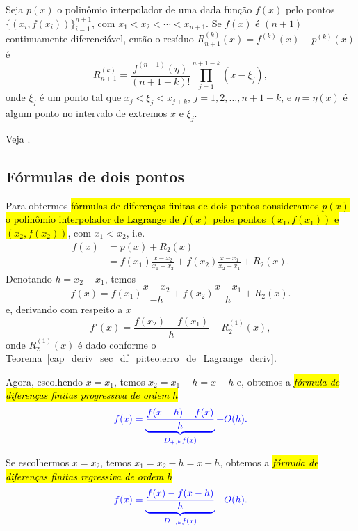 \begin{teo}\label{cap_deriv_sec_df_pi:teo:erro_de_Lagrange_deriv}
  Seja $p(x)$ o polinômio interpolador de uma dada função $f(x)$ pelo pontos $\{(x_i, f(x_i))\}_{i=1}^{n+1}$, com $x_1<x_2<\cdots<x_{n+1}$. Se $f(x)$ é $(n+1)$ continuamente diferenciável, então o resíduo $R_{n+1}^{(k)}(x) = f^{(k)}(x) - p^{(k)}(x)$ é
  \begin{equation}
    R_{n+1}^{(k)} = \frac{f^{(n+1)}(\eta) }{(n+1-k)!}\prod_{j=1}^{n+1-k}(x-\xi_j),
  \end{equation}
onde $\xi_j$ é um ponto tal que $x_j < \xi_j < x_{j+k}$, $j=1, 2, \dotsc, n+1+k$, e $\eta = \eta(x)$ é algum ponto no intervalo de extremos $x$ e $\xi_j$. 
\end{teo}
\begin{dem}
  Veja \cite[Ch.6, Sec.5]{Isaacson1994a}.
\end{dem}

\subsection{Fórmulas de dois pontos}

Para obtermos \hl{fórmulas de diferenças finitas de dois pontos consideramos  $p(x)$ o polinômio interpolador de Lagrange de $f(x)$ pelos pontos $(x_1, f(x_1))$ e $(x_2, f(x_2))$}, com $x_1 < x_2$, i.e.
\begin{align}
  f(x) &= p(x) + R_{2}(x)\\
  &= f(x_1)\frac{x-x_2}{x_1-x_2} + f(x_2)\frac{x-x_1}{x_2-x_1} + R_2(x).
\end{align}
Denotando $h=x_2-x_1$, temos
\begin{equation}
  f(x) = f(x_1)\frac{x-x_2}{-h} + f(x_2)\frac{x-x_1}{h} + R_2(x).
\end{equation}
e, derivando com respeito a $x$
\begin{equation}
  f'(x) = \frac{f(x_2)-f(x_1)}{h} + R_2^{(1)}(x),
\end{equation}
onde $ R_2^{(1)}(x)$ é dado conforme o Teorema~\ref{cap_deriv_sec_df_pi:teo:erro_de_Lagrange_deriv}.

Agora, escolhendo $x=x_1$, temos $x_2 = x_1 + h = x + h$ e, obtemos a \hl{\emph{fórmula de diferenças finitas progressiva de ordem $h$}}
\begin{equation}\color{blue}f(x) = \underbrace{\frac{f(x+h) - f(x)}{h}}_{D_{+,h}f(x)} + O(h).
\end{equation}

Se escolhermos $x=x_2$, temos $x_1 = x_2 - h = x - h$, obtemos a \hl{\emph{fórmula de diferenças finitas regressiva de ordem $h$}}
\begin{equation}\color{blue}f(x) = \underbrace{\frac{f(x) - f(x-h)}{h}}_{D_{-,h}f(x)} + O(h).
\end{equation}

